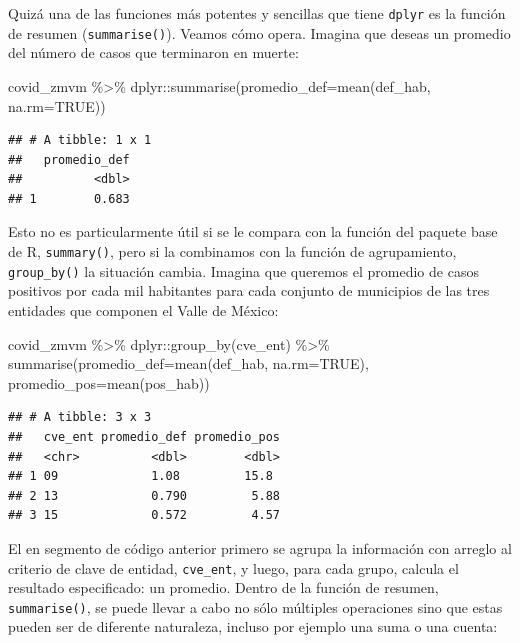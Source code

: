 \documentclass[
  11pt,
  oneside]{book}
\newenvironment{Shaded}{\begin{snugshade}}{\end{snugshade}}
\newcommand{\AttributeTok}[1]{\textcolor[rgb]{0.77,0.63,0.00}{#1}}
\newcommand{\ConstantTok}[1]{\textcolor[rgb]{0.00,0.00,0.00}{#1}}
\newcommand{\FunctionTok}[1]{\textcolor[rgb]{0.00,0.00,0.00}{#1}}
\newcommand{\NormalTok}[1]{#1}
\newcommand{\SpecialCharTok}[1]{\textcolor[rgb]{0.00,0.00,0.00}{#1}}
\begin{document}
Quizá una de las funciones más potentes y sencillas que tiene \texttt{dplyr} es la función de resumen (\texttt{summarise()}). Veamos cómo opera. Imagina que deseas un promedio del número de casos que terminaron en muerte:

\begin{Shaded}
\begin{Highlighting}[]
\NormalTok{covid\_zmvm }\SpecialCharTok{\%\textgreater{}\%}
\NormalTok{  dplyr}\SpecialCharTok{::}\FunctionTok{summarise}\NormalTok{(}\AttributeTok{promedio\_def=}\FunctionTok{mean}\NormalTok{(def\_hab, }\AttributeTok{na.rm=}\ConstantTok{TRUE}\NormalTok{))}
\end{Highlighting}
\end{Shaded}

\begin{verbatim}
## # A tibble: 1 x 1
##   promedio_def
##          <dbl>
## 1        0.683
\end{verbatim}

Esto no es particularmente útil si se le compara con la función del paquete base de R, \texttt{summary()}, pero si la combinamos con la función de agrupamiento, \texttt{group\_by()} la situación cambia. Imagina que queremos el promedio de casos positivos por cada mil habitantes para cada conjunto de municipios de las tres entidades que componen el Valle de México:

\begin{Shaded}
\begin{Highlighting}[]
\NormalTok{covid\_zmvm }\SpecialCharTok{\%\textgreater{}\%}
\NormalTok{  dplyr}\SpecialCharTok{::}\FunctionTok{group\_by}\NormalTok{(cve\_ent) }\SpecialCharTok{\%\textgreater{}\%} 
  \FunctionTok{summarise}\NormalTok{(}\AttributeTok{promedio\_def=}\FunctionTok{mean}\NormalTok{(def\_hab, }\AttributeTok{na.rm=}\ConstantTok{TRUE}\NormalTok{), }\AttributeTok{promedio\_pos=}\FunctionTok{mean}\NormalTok{(pos\_hab))}
\end{Highlighting}
\end{Shaded}

\begin{verbatim}
## # A tibble: 3 x 3
##   cve_ent promedio_def promedio_pos
##   <chr>          <dbl>        <dbl>
## 1 09             1.08         15.8 
## 2 13             0.790         5.88
## 3 15             0.572         4.57
\end{verbatim}

El en segmento de código anterior primero se agrupa la información con arreglo al criterio de clave de entidad, \texttt{cve\_ent}, y luego, para cada grupo, calcula el resultado especificado: un promedio. Dentro de la función de resumen, \texttt{summarise()}, se puede llevar a cabo no sólo múltiples operaciones sino que estas pueden ser de diferente naturaleza, incluso por ejemplo una suma o una cuenta:
\end{document}
